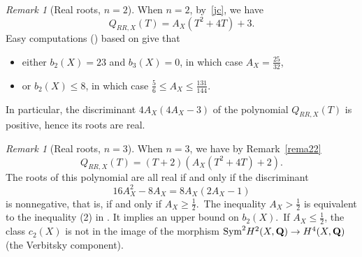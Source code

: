 \documentclass[12pt]{amsart}
\def\cO{\mathscr{O}}
\def\Q{{\bf Q}}
\DeclareMathOperator{\Sym}{Sym}
\DeclareMathOperator{\td}{td}
\theoremstyle{remark}
\newtheorem{rema}[lemm]{Remark}
\begin{document}
 \begin{rema}[Real roots, $n=2$]
\label{en2}
When $n=2$, by~\eqref{jc}, we have
\begin{equation*}%
Q_{RR,X}(T) = A_X(T^2+4 T)+3.
\end{equation*}
Easy computations (\cite[Lemma~4.1]{dhmv}) based on \cite[Main Theorem]{gua} give that
%
%
\begin{itemize}
\item either $b_2(X) =23$ and  $b_3(X) =0$, 
in which case 
 $A_X=\frac{25}{32}$, 
\item or $b_2(X) \le 8$, in which case 
$ \frac{5}{6}\le A_X\le \frac{131}{144}$.
\end{itemize}
In particular, the  discriminant 
$
4A_X(4A_X-3)$
of the polynomial $Q_{RR,X}(T)$ is positive, hence its roots are real. 
\end{rema}

  \begin{rema}[Real roots, $n=3$]
 When $n=3$, we have by Remark~\ref{rema22}
 $$Q_{RR,X}(T) =(T+2)(A_X(T^2+4T)+2).$$
 The roots of this polynomial  are all real if and only if   the discriminant
 $$16A_X^2-8A_X=8A_X(2A_X-1)$$
  is nonnegative, that is, if and only if $A_X\ge  \frac12$.\ The inequality $A_X>  \frac12$ is equivalent to the inequality (2) in \cite{beso}. It implies an upper   bound on $b_2(X)$.\ If $A_X\le  \frac12$, the class $c_2(X)$ is not in  the image of the morphism $\Sym^2\!H^2(X,\Q)\to H^4(X,\Q)$ (the Verbitsky component).
 
 
 \end{rema}
\end{document}
